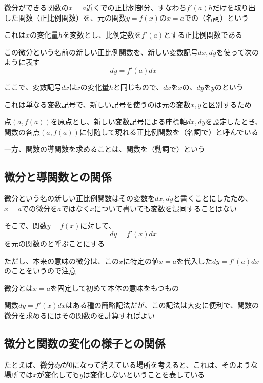 \documentclass[../book_infinite_continuous_math]{subfiles}
\begin{document}
微分ができる関数の$x=a$近くでの正比例部分、すなわち$f'(a)h$だけを取り出した関数（正比例関数）を、元の関数$y=f(x)$の$x=a$での（名詞）という

これは$x$の変化量$h$を変数とし、比例定数を$f'(a)$とする正比例関数である

この微分という名前の新しい正比例関数を、新しい変数記号$dx, dy$を使って次のように表す
\begin{equation*}
  dy = f'(a)dx
\end{equation*}

ここで、変数記号$dx$は$x$の変化量$h$と同じもので、$dx$を$x$の、$dy$を$y$のという

これは単なる変数記号で、新しい記号を使うのは元の変数$x, y$と区別するため

\br

点$(a, f(a))$を原点とし、新しい変数記号による座標軸$dx,dy$を設定したとき、関数の各点$(a, f(a))$に付随して現れる正比例関数を（名詞で）と呼んでいる

一方、関数の導関数を求めることは、関数を（動詞で）という

\sectionline
\subsection{微分と導関数との関係}

微分という名の新しい正比例関数はその変数を$dx,dy$と書くことにしたため、$x=a$での微分を$a$ではなく$x$について書いても変数を混同することはない

そこで、関数$y=f(x)$に対して、
\begin{equation*}
  dy = f'(x)dx
\end{equation*}
を元の関数のと呼ぶことにする

ただし、本来の意味の微分は、この$x$に特定の値$x=a$を代入した$dy = f'(a)dx$のことをいうので注意

\br

微分とは$x=a$を固定して初めて本体の意味をもつもの

関数$dy = f'(x)dx$はある種の簡略記法だが、この記法は大変に便利で、関数の微分を求めるにはその関数のを計算すればよい

\sectionline
\subsection{微分と関数の変化の様子との関係}

たとえば、微分$dy$が$0$になって消えている場所を考えると、これは、そのような場所では$x$が変化しても$y$は変化しないということを表している
\end{document}
